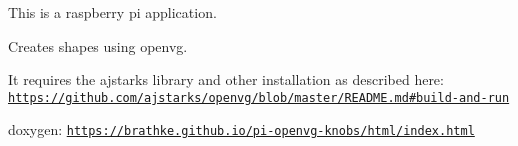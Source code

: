 This is a raspberry pi application.

Creates shapes using openvg.

It requires the ajstarks library and other installation as described here\+: \href{https://github.com/ajstarks/openvg/blob/master/README.md#build-and-run}{\tt https\+://github.\+com/ajstarks/openvg/blob/master/\+R\+E\+A\+D\+M\+E.\+md\#build-\/and-\/run}

doxygen\+: \href{https://brathke.github.io/pi-openvg-knobs/html/index.html}{\tt https\+://brathke.\+github.\+io/pi-\/openvg-\/knobs/html/index.\+html} 